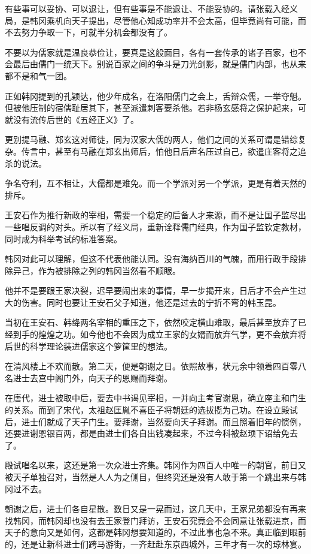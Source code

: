 有些事可以妥协、可以退让，但有些事是不能退让、不能妥协的。请张载入经义局，是韩冈乘机向天子提出，尽管他心知成功率并不会太高，但毕竟尚有可能，而不去努力争取一下，可就半分机会都没有了。

不要以为儒家就是温良恭俭让，要真是这般面目，各有一套传承的诸子百家，也不会最后由儒门一统天下。别说百家之间的争斗是刀光剑影，就是儒门内部，也从来都不是和气一团。

正如韩冈提到的孔颖达，他少年成名，在洛阳儒门之会上，舌辩众儒，一举夺魁。但被他压制的宿儒耻居其下，甚至派遣刺客要杀他。若非杨玄感将之保护起来，可就没有流传后世的《五经正义》了。

更别提马融、郑玄这对师徒，同为汉家大儒的两人，他们之间的关系可谓是错综复杂。传言中，甚至有马融在郑玄出师后，怕他日后声名压过自己，欲遣庄客将之追杀的说法。

争名夺利，互不相让，大儒都是难免。而一个学派对另一个学派，更是有着天然的排斥。

王安石作为推行新政的宰相，需要一个稳定的后备人才来源，而不是让国子监尽出一些唱反调的对头。所以有了经义局，重新诠释儒门经典，作为国子监钦定教材，同时成为科举考试的标准答案。

韩冈对此可以理解，但这不代表他能认同。没有海纳百川的气魄，而用行政手段排除异己，作为被排除之列的韩冈当然看不顺眼。

他并不是要跟王家决裂，迟早要闹出来的事情，早一步揭开来，日后才不会产生过大的伤害。同时也要让王安石父子知道，他还是过去的宁折不弯的韩玉昆。

当初在王安石、韩绛两名宰相的重压之下，依然咬定横山难取，最后甚至放弃了已经到手的煌煌之功。如今他也不会因为成立王家的女婿而放弃气学，更不会放弃将后世的科学理论装进儒家这个箩筐里的想法。

在清风楼上不欢而散。第二天，便是朝谢之日。依照故事，状元余中领着四百零八名进士去宫中阁门外，向天子的恩赐而拜谢。

在唐代，进士被取中后，要去中书谒见宰相，一并向主考官谢恩，确立座主和门生的关系。而到了宋代，太祖赵匡胤不喜臣子将朝廷的选拔揽为己功。在设立殿试后，进士们就成了天子门生。要拜谢，当然要向天子拜谢。而且照着旧年的惯例，还要进谢恩银百两，都是由进士们各自出钱凑起来，不过今科被赵顼下诏给免去了。

殿试唱名以来，这还是第一次众进士齐集。韩冈作为四百人中唯一的朝官，前日又被天子单独召对，当然是人人为之侧目，但终究还是没有人敢于第一个跳出来与韩冈过不去。

朝谢之后，进士们各自星散。数日又是一晃而过，这几天中，王家兄弟都没有再来找韩冈，而韩冈却也没有去王家登门拜访，王安石究竟会不会同意让张载进京，而天子的意向又是如何，这都是韩冈想要知道的，不过此事也急不来。真正临到眼前的，还是让新科进士们跨马游街，一齐赶赴东京西城外，三年才有一次的琼林宴。

